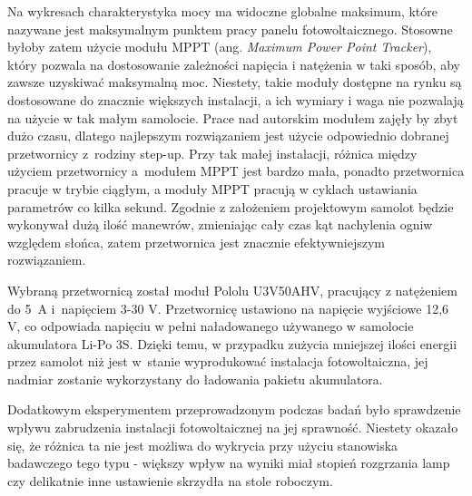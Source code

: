 \documentclass[12pt, a4paper]{article}
\begin{document}
Na wykresach charakterystyka mocy ma widoczne globalne maksimum, które nazywane jest maksymalnym punktem pracy panelu fotowoltaicznego. Stosowne byłoby zatem użycie modułu MPPT (ang. \textit{Maximum Power Point Tracker}), który pozwala na dostosowanie zależności napięcia i natężenia w taki sposób, aby zawsze uzyskiwać maksymalną moc. Niestety, takie moduły dostępne na rynku są dostosowane do znacznie większych instalacji, a ich wymiary i waga nie pozwalają na użycie w tak małym samolocie. Prace nad autorskim modułem zajęły by zbyt dużo czasu, dlatego najlepszym rozwiązaniem jest użycie odpowiednio dobranej przetwornicy z~rodziny step-up. Przy tak małej instalacji, różnica między użyciem przetwornicy a~modułem MPPT jest bardzo mała, ponadto przetwornica pracuje w trybie ciągłym, a moduły MPPT pracują w cyklach ustawiania parametrów co kilka sekund. Zgodnie z założeniem projektowym samolot będzie wykonywał dużą ilość manewrów, zmieniając cały czas kąt nachylenia ogniw względem słońca, zatem przetwornica jest znacznie efektywniejszym rozwiązaniem.

Wybraną przetwornicą został moduł Pololu U3V50AHV, pracujący z natężeniem do 5~A i~napięciem 3-30 V. Przetwornicę ustawiono na napięcie wyjściowe 12,6 V, co odpowiada napięciu w pełni naładowanego używanego w samolocie akumulatora Li-Po 3S. Dzięki temu, w przypadku zużycia mniejszej ilości energii przez samolot niż jest w~stanie wyprodukować instalacja fotowoltaiczna, jej nadmiar zostanie wykorzystany do ładowania pakietu akumulatora.

Dodatkowym eksperymentem przeprowadzonym podczas badań było sprawdzenie wpływu zabrudzenia instalacji fotowoltaicznej na jej sprawność. Niestety okazało się, że różnica ta nie jest możliwa do wykrycia przy użyciu stanowiska badawczego tego typu - większy wpływ na wyniki miał stopień rozgrzania lamp czy delikatnie inne ustawienie skrzydła na stole roboczym.
\end{document}
